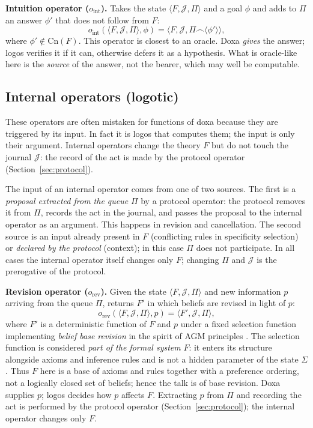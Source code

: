\documentclass[12pt,a4paper]{article}
\begin{document}
\textbf{Intuition operator ($o_{\text{int}}$).} Takes the state
$\langle F, \mathcal{J}, \Pi \rangle$ and a goal $\phi$ and adds to $\Pi$ an
answer $\phi'$ that does not follow from $F$:
\[
o_{\text{int}}(\langle F, \mathcal{J}, \Pi \rangle, \phi)
= \langle F, \mathcal{J}, \Pi \frown \langle \phi' \rangle \rangle,
\]
where $\phi' \notin \mathrm{Cn}(F)$. This operator is closest to an oracle.
Doxa \emph{gives} the answer; logos verifies it if it can, otherwise defers it
as a hypothesis. What is oracle-like here is the \emph{source} of the answer,
not the bearer, which may well be computable.

\subsection{Internal operators (logotic)}
\label{sec:internal}

These operators are often mistaken for functions of doxa because they are
triggered by its input. In fact it is logos that computes them; the input is
only their argument. Internal operators change the theory $F$ but do not touch
the journal $\mathcal{J}$: the record of the act is made by the protocol
operator (Section~\ref{sec:protocol}).

The input of an internal operator comes from one of two sources. The first is
a \emph{proposal extracted from the queue} $\Pi$ by a protocol operator: the
protocol removes it from $\Pi$, records the act in the journal, and passes the
proposal to the internal operator as an argument. This happens in revision
and cancellation. The second source is an input already present in $F$
(conflicting rules in specificity selection) or \emph{declared by the
protocol} (context); in this case $\Pi$ does not participate. In all cases the
internal operator itself changes only $F$; changing $\Pi$ and $\mathcal{J}$ is
the prerogative of the protocol.

\textbf{Revision operator ($o_{\text{rev}}$).} Given the state
$\langle F, \mathcal{J}, \Pi \rangle$ and new information $p$ arriving from
the queue $\Pi$, returns $F'$ in which beliefs are revised in light of $p$:
\[
o_{\text{rev}}(\langle F, \mathcal{J}, \Pi \rangle, p)
= \langle F', \mathcal{J}, \Pi \rangle,
\]
where $F'$ is a deterministic function of $F$ and $p$ under a fixed selection
function implementing \emph{belief base revision} in the spirit of AGM
principles \cite{agm}. The selection function is considered \emph{part of the
formal system} $F$: it enters its structure alongside axioms and inference
rules and is not a hidden parameter of the state $\Sigma$. Thus $F$ here is a
base of axioms and rules together with a preference ordering, not a logically
closed set of beliefs; hence the talk is of base revision. Doxa supplies $p$;
logos decides how $p$ affects $F$. Extracting $p$ from $\Pi$ and recording the
act is performed by the protocol operator (Section~\ref{sec:protocol}); the
internal operator changes only $F$.
\end{document}

